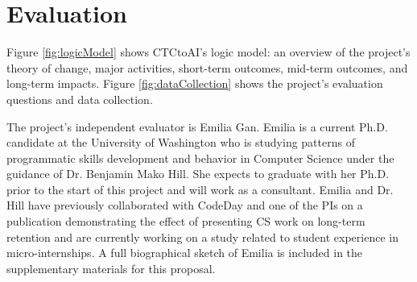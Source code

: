 \section{Evaluation}

Figure \ref{fig:logicModel} shows CTCtoAI's logic model: an overview of the project’s theory of change, major activities, short-term outcomes, mid-term outcomes, and long-term impacts. Figure \ref{fig:dataCollection} shows the project's evaluation questions and data collection.




The project's independent evaluator is Emilia Gan. Emilia is a current Ph.D. candidate at the University of Washington who is studying patterns of programmatic skills development and behavior in Computer Science under the guidance of Dr. Benjamin Mako Hill. She expects to graduate with her Ph.D. prior to the start of this project and will work as a consultant. Emilia and Dr. Hill have previously collaborated with CodeDay and one of the PIs on a publication demonstrating the effect of presenting CS work on long-term retention and are currently working on a study related to student experience in micro-internships. A full biographical sketch of Emilia is included in the supplementary materials for this proposal.


